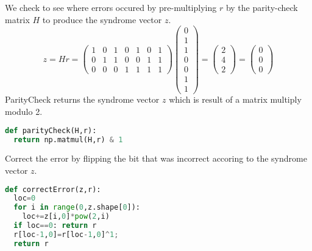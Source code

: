 \documentclass[12pt]{article}
\begin{document}
\noindent We check to see where errors occured by pre-multiplying $r$ by the parity-check matrix $H$ to produce the syndrome vector $z$. 
\[
  z = Hr = 
  \begin{pmatrix}
    1 & 0 & 1 & 0 & 1 & 0 & 1 \\
    0 & 1 & 1 & 0 & 0 & 1 & 1 \\
    0 & 0 & 0 & 1 & 1 & 1 & 1 
  \end{pmatrix}
  \begin{pmatrix}
    0 \\
    1 \\
    1 \\
    0 \\
    0 \\
    1 \\
    1
  \end{pmatrix} 
  =
  \begin{pmatrix}
    2 \\
    4 \\
    2
  \end{pmatrix} 
  =
  \begin{pmatrix}
    0 \\
    0 \\
    0
  \end{pmatrix}
\]
ParityCheck returns the syndrome vector $z$ which is result of a matrix multiply modulo 2.
\begin{lstlisting}[frame=single,language=Python,caption=parityCheck \label{code:makeMessage}]
def parityCheck(H,r): 
  return np.matmul(H,r) & 1
\end{lstlisting}

\newpage
\noindent Correct the error by flipping the bit that was incorrect accoring to the syndrome vector $z$.
\begin{lstlisting}[frame=single,language=Python,caption=correctError \label{code:makeMessage}]
def correctError(z,r): 
  loc=0
  for i in range(0,z.shape[0]):
    loc+=z[i,0]*pow(2,i)
  if loc==0: return r
  r[loc-1,0]=r[loc-1,0]^1;
  return r
\end{lstlisting}
\end{document}
